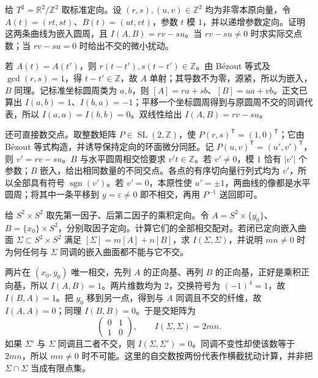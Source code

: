 \begin{exercise}\label{g2:ex:torus-slope-intersection}
	给 \(T^2=\mathbb R^2/\mathbb Z^2\) 取标准定向。设 \((r,s),(u,v)\in\mathbb Z^2\) 均为非零本原向量，令 \(A(t)=(rt,st)\)、\(B(t)=(ut,vt)\)，参数 \(t\) 模 \(1\)，并以递增参数定向。证明这两条曲线为嵌入圆周，且 \(I(A,B)=rv-su\)。当 \(rv-su\ne0\) 时求实际交点数；当 \(rv-su=0\) 时给出不交的微小扰动。
\end{exercise}
\begin{solution}
	若 \(A(t)=A(t')\)，则 \(r(t-t'),s(t-t')\in\mathbb Z\)。由 Bézout 等式及 \(\gcd(r,s)=1\)，得 \(t-t'\in\mathbb Z\)，故 \(A\) 单射；其导数不为零，源紧，所以为嵌入，\(B\) 同理。记标准坐标圆周类为 \(a,b\)，则 \([A]=ra+sb\)、\([B]=ua+vb\)。正文已算出 \(I(a,b)=1\)、\(I(b,a)=-1\)；平移一个坐标圆周得到与原圆周不交的同调代表，所以 \(I(a,a)=I(b,b)=0\)。双线性给出 \(I(A,B)=rv-su\)。

	还可直接数交点。取整数矩阵 \(P\in\operatorname{SL}(2,\mathbb Z)\)，使 \(P(r,s)^{\mathsf T}=(1,0)^{\mathsf T}\)；它由 Bézout 等式构造，并诱导保持定向的环面微分同胚。记 \(P(u,v)^{\mathsf T}=(u',v')^{\mathsf T}\)，则 \(v'=rv-su\)。\(B\) 与水平圆周相交恰要求 \(v't\in\mathbb Z\)。若 \(v'\ne0\)，模 \(1\) 恰有 \(|v'|\) 个参数；\(B\) 嵌入，给出相同数量的不同交点。各点的有序切向量行列式均为 \(v'\)，所以全部具有符号 \(\operatorname{sgn}(v')\)。若 \(v'=0\)，本原性使 \(u'=\pm1\)，两曲线的像都是水平圆周；将其中一条平移到 \(y=\varepsilon\ne0\) 即不相交，再用 \(P^{-1}\) 送回即可。
\end{solution}

\begin{exercise}\label{g2:ex:product-sphere-self-intersection}
	给 \(S^2\times S^2\) 取先第一因子、后第二因子的乘积定向。令 \(A=S^2\times\{y_0\}\)、\(B=\{x_0\}\times S^2\)，分别取因子定向。计算它们的全部相交配对。若闭已定向嵌入曲面 \(\Sigma\subset S^2\times S^2\) 满足 \([\Sigma]=m[A]+n[B]\)，求 \(I(\Sigma,\Sigma)\)，并说明 \(mn\ne0\) 时为何任何与 \(\Sigma\) 同调的嵌入曲面都不能与它不交。
\end{exercise}
\begin{solution}
	两片在 \((x_0,y_0)\) 唯一相交，先列 \(A\) 的正向基、再列 \(B\) 的正向基，正好是乘积正向基，所以 \(I(A,B)=1\)。两片维数均为 \(2\)，交换符号为 \((-1)^4=1\)，故 \(I(B,A)=1\)。把 \(y_0\) 移到另一点，得到与 \(A\) 同调且不交的纤维，故 \(I(A,A)=0\)；同理 \(I(B,B)=0\)。于是交矩阵为
	\[
		\begin{pmatrix}0&1\\1&0\end{pmatrix},\qquad
		I(\Sigma,\Sigma)=2mn.
	\]
	如果 \(\Sigma'\) 与 \(\Sigma\) 同调且二者不交，则 \(I(\Sigma,\Sigma')=0\)。同调不变性却使该数等于 \(2mn\)，所以 \(mn\ne0\) 时不可能。这里的自交数按两份代表作横截扰动计算，并非把 \(\Sigma\cap\Sigma\) 当成有限点集。
\end{solution}

